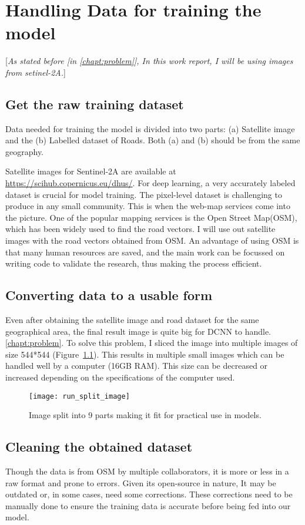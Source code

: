 \chapter{Handling Data for training the model}\label{chapt:data}
[\textit{As stated before [in \ref{chapt:problem}], In this work report, I will be using images from setinel-2A.}]

\section{Get the raw training dataset}
Data needed for training the model is divided into two parts: (a) Satellite image and the (b) Labelled dataset of Roads. Both (a) and (b) should be from the same geography. \par

Satellite images for Sentinel-2A are available at \url{https://scihub.copernicus.eu/dhus/}. For deep learning, a very accurately labeled dataset is crucial for model training. The pixel-level dataset is challenging to produce in any small community. This is when the web-map services come into the picture. One of the popular mapping services is the Open Street Map(OSM), which has been widely used to find the road vectors. I will use out satellite images with the road vectors obtained from OSM. An advantage of using OSM is that many human resources are saved, and the main work can be focussed on writing code to validate the research, thus making the process efficient.


\section{Converting data to a usable form}
Even after obtaining the satellite image and road dataset for the same geographical area, the final result image is quite big for DCNN to handle. \ref{chapt:problem}. To solve this problem, I sliced the image into multiple images of size 544*544 (Figure~\ref{fig:run_split_images}). This results in multiple small images which can be handled well by a computer (16GB RAM). This size can be decreased or increased depending on the specifications of the computer used.

\begin{figure}[h!]
  \centering
  \texttt{[image: run\_split\_image]}
  \caption{Image split into 9 parts making it fit for practical use in models.}
  \label{fig:run_split_images}
\end{figure}


\section{Cleaning the obtained dataset}
Though the data is from OSM by multiple collaborators, it is more or less in a raw format and prone to errors. Given its open-source in nature, It may be outdated or, in some cases, need some corrections. These corrections need to be manually done to ensure the training data is accurate before being fed into our model. \par

